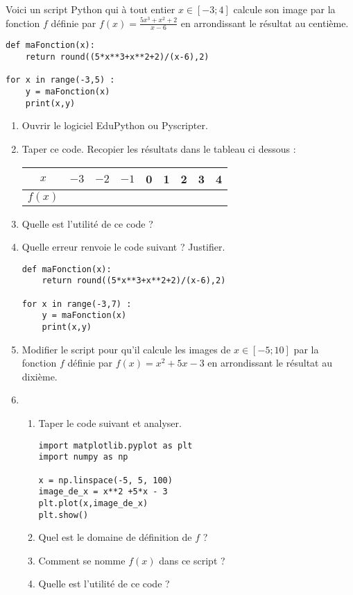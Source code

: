 
Voici un script Python qui à tout entier $x \in [-3;4]$ calcule son image par la fonction $f$ définie par $f(x)=\frac{5x^3+x^2+2}{x-6}$ en arrondissant le résultat au centième.

\begin{lstlisting}
def maFonction(x):
    return round((5*x**3+x**2+2)/(x-6),2)

for x in range(-3,5) :
    y = maFonction(x)
    print(x,y)
 \end{lstlisting}   
    
\begin{enumerate}
\item Ouvrir le logiciel EduPython ou Pyscripter.
\item Taper ce code. Recopier les résultats dans le tableau ci dessous :

\begin{tabular}{|c|c|c|c|c|c|c|c|c|}
\hline 
$x$ & $-3$ & $-2$ & $-1$ & 0 & 1 & 2 & 3 & 4 \\ 
\hline 
$f(x)$ &   &   &   &   &   &   &   &  \\ 
\hline 
\end{tabular} 

\item Quelle est l'utilité de ce code ?

\item Quelle erreur renvoie le code suivant ? Justifier.

\begin{lstlisting}
def maFonction(x):
    return round((5*x**3+x**2+2)/(x-6),2)

for x in range(-3,7) :
    y = maFonction(x)
    print(x,y)
 \end{lstlisting}

\item Modifier le script pour qu'il calcule les images de $x \in [-5;10]$ par la fonction $f$ définie par $f(x)= x^2 +5x - 3 $ en arrondissant le résultat au dixième.

\item  

\begin{enumerate}
\item 
Taper le code suivant et analyser.
\begin{lstlisting}
import matplotlib.pyplot as plt
import numpy as np

x = np.linspace(-5, 5, 100)
image_de_x = x**2 +5*x - 3
plt.plot(x,image_de_x)
plt.show()
\end{lstlisting}
\item Quel est le domaine de définition de $f$ ?
\item Comment se nomme $f(x)$ dans ce script ?
\item  Quelle est l'utilité de ce code ?
\end{enumerate}  


 \end{enumerate}